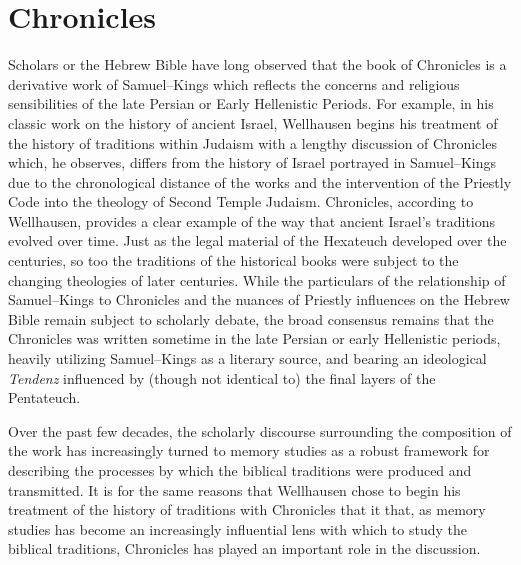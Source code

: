 \chapter{Chronicles}\label{chronicles}

Scholars or the Hebrew Bible have long observed that the book of
Chronicles is a derivative work of Samuel--Kings which reflects the
concerns and religious sensibilities of the late Persian or Early
Hellenistic Periods. For example, in his classic work on the history of
ancient Israel, Wellhausen begins his treatment of the history of
traditions within Judaism with a lengthy discussion of Chronicles which,
he observes, differs from the history of Israel portrayed in
Samuel--Kings due to the chronological distance of the works and the
intervention of the Priestly Code into the theology of Second Temple
Judaism.\autocite[171--172]{wellhausen1957} Chronicles, according to
Wellhausen, provides a clear example of the way that ancient Israel's
traditions evolved over time. Just as the legal material of the
Hexateuch developed over the centuries, so too the traditions of the
historical books were subject to the changing theologies of later
centuries. While the particulars of the relationship of Samuel--Kings to
Chronicles and the nuances of Priestly influences on the Hebrew Bible
remain subject to scholarly debate, the broad consensus remains that the
Chronicles was written sometime in the late Persian or early Hellenistic
periods, heavily utilizing Samuel--Kings as a literary source, and
bearing an ideological \emph{Tendenz} influenced by (though not
identical to) the final layers of the Pentateuch.\autocites[For a
thorough and reasonably recent summary of the \emph{status questionis},
see][72--89]{knoppers2003}[See
also][]{japhet1993}{japhet2009}{braun1986}[and][]{coggins1976}

Over the past few decades, the scholarly discourse surrounding the
composition of the work has increasingly turned to memory studies as a
robust framework for describing the processes by which the biblical
traditions were produced and
transmitted.\autocites{wright2014}{blenkinsopp2013}{rogerson2010}{davies2008}{hendel2005}{smith_cbq2002}
It is for the same reasons that Wellhausen chose to begin his treatment
of the history of traditions with Chronicles that it that, as memory
studies has become an increasingly influential lens with which to study
the biblical traditions, Chronicles has played an important role in the
discussion.\autocites{benzvi_st2017}{benzvi-a_evans-williams2013}[
]{benzvi-b_evans-williams2013}
